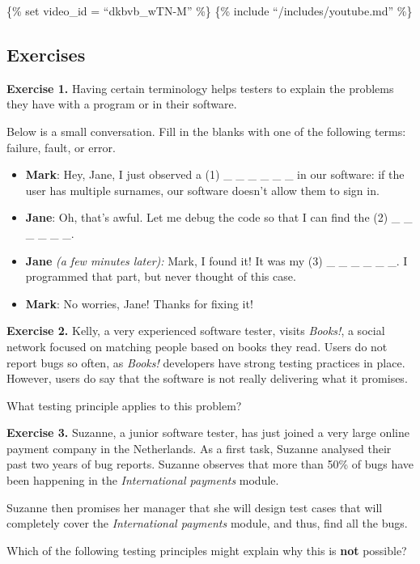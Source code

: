 \{\% set video\_id = ``dkbvb\_wTN-M'' \%\} \{\% include
``/includes/youtube.md'' \%\}

\hypertarget{exercises}{%
\subsection{Exercises}\label{exercises}}

\textbf{Exercise 1.} Having certain terminology helps testers to explain
the problems they have with a program or in their software.

Below is a small conversation. Fill in the blanks with one of the
following terms: failure, fault, or error.

\begin{itemize}
\tightlist
\item
  \textbf{Mark}: Hey, Jane, I just observed a (1) \_ \_ \_ \_ \_ \_ in
  our software: if the user has multiple surnames, our software doesn't
  allow them to sign in.
\item
  \textbf{Jane}: Oh, that's awful. Let me debug the code so that I can
  find the (2) \_ \_ \_ \_ \_ \_.
\item
  \textbf{Jane} \emph{(a few minutes later):} Mark, I found it! It was
  my (3) \_ \_ \_ \_ \_ \_. I programmed that part, but never thought of
  this case.
\item
  \textbf{Mark}: No worries, Jane! Thanks for fixing it!
\end{itemize}

\textbf{Exercise 2.} Kelly, a very experienced software tester, visits
\emph{Books!}, a social network focused on matching people based on
books they read. Users do not report bugs so often, as \emph{Books!}
developers have strong testing practices in place. However, users do say
that the software is not really delivering what it promises.

What testing principle applies to this problem?

\textbf{Exercise 3.} Suzanne, a junior software tester, has just joined
a very large online payment company in the Netherlands. As a first task,
Suzanne analysed their past two years of bug reports. Suzanne observes
that more than 50\% of bugs have been happening in the
\emph{International payments} module.

Suzanne then promises her manager that she will design test cases that
will completely cover the \emph{International payments} module, and
thus, find all the bugs.

Which of the following testing principles might explain why this is
\textbf{not} possible?

